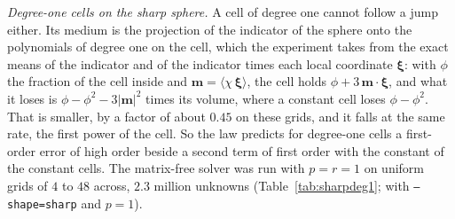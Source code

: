 \documentclass[11pt,a4paper]{article}
\begin{document}
\emph{Degree-one cells on the sharp sphere.} A cell of degree one cannot follow a jump either. Its
medium is the projection of the indicator of the sphere onto the polynomials of degree one on the cell,
which the experiment takes from the exact means of the indicator and of the indicator times each local
coordinate $\boldsymbol\xi$: with $\phi$ the fraction of the cell inside and
$\mathbf m=\langle\chi\,\boldsymbol\xi\rangle$, the cell holds $\phi+3\,\mathbf m\cdot\boldsymbol\xi$,
and what it loses is $\phi-\phi^2-3\lvert\mathbf m\rvert^2$ times its volume, where a constant cell loses
$\phi-\phi^2$. That is smaller, by a factor of about $0.45$ on these grids, and it falls at the same
rate, the first power of the cell. So the law predicts for degree-one cells a first-order error of high
order beside a second term of first order with the constant of the constant cells. The matrix-free
solver was run with $p=r=1$ on uniform grids of $4$ to $48$ across, $2.3$ million unknowns
(Table~\ref{tab:sharpdeg1};  with \texttt{--shape=sharp} and
$p=1$).
\end{document}

